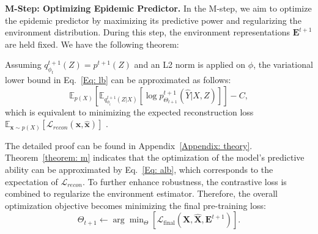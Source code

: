 {\textbf{M-Step: Optimizing Epidemic Predictor.} In the M-step, we aim to optimize the epidemic predictor by maximizing its predictive power and regularizing the environment distribution. During this step, the environment representations $\mathbf{E}^{t+1}$ are held fixed. We have the following theorem:
\begin{theorem}
\label{theorem: m}
Assuming $q^{t+1}_{\phi_{t}}(Z)=p^{t+1}(Z)$ and an L2 norm is applied on $\phi$, the variational lower bound in Eq.~\eqref{Eq: lb} can be approximated as follows:
\begin{equation}
\label{Eq: alb}
\mathbb{E}_{p(X)} \left[ \mathbb{E}_{q^{t+1}_{\phi_{t}}(Z | X)}  \left[ \log p^{t+1}_{\Theta_{t+1}}(\hat{Y} | X, Z) \right]\right] - C,
\end{equation}
which is equivalent to minimizing the expected reconstruction loss $\mathbb{E}_{\mathbf{x}\sim p(X)}[\mathcal{L}_{recon}(\mathbf{x}, \hat{\mathbf{x}})]$ .
\end{theorem}
The detailed proof can be found in Appendix~\ref{Appendix: theory}. Theorem~\ref{theorem: m} indicates that the optimization of the model's predictive ability can be approximated by Eq.~\eqref{Eq: alb}, which corresponds to the expectation of $\mathcal{L}_{recon}$. To further enhance robustness, the contrastive loss is combined to regularize the environment estimator. Therefore, the overall optimization objective becomes minimizing the final pre-training loss:
\begin{equation}
\Theta_{t+1} \leftarrow \arg\min\nolimits_{\Theta} \left[ \mathcal{L}_{\text{final}}(\mathbf{X}, \hat{\mathbf{X}}, \mathbf{E}^{t+1}) \right].
\end{equation}






}

